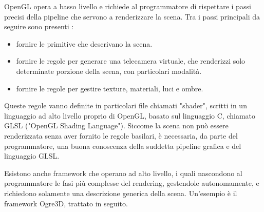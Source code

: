 OpenGL opera a basso livello e richiede al programmatore di rispettare i passi precisi della pipeline che servono a renderizzare la scena. Tra i passi principali da seguire sono presenti :

\begin{itemize}
\item fornire le primitive che descrivano la scena.
\item fornire le regole per generare una telecamera virtuale, che renderizzi solo determinate porzione della scena, con particolari modalità.
\item fornire le regole per gestire texture, materiali, luci e ombre.
\end{itemize}

Queste regole vanno definite in particolari file chiamati "shader", scritti in un linguaggio ad alto livello proprio di OpenGL, basato sul linguaggio C, chiamato GLSL ("OpenGL Shading Language"). Siccome la scena non può essere renderizzata senza aver fornito le regole basilari, è necessaria, da parte del programmatore, una buona conoscenza della suddetta pipeline grafica e del linguaggio GLSL.

Esistono anche framework che operano ad alto livello, i quali nascondono al programmatore le fasi più complesse del rendering, gestendole autonomamente, e richiedono solamente una descrizione generica della scena. Un'esempio è il framework Ogre3D, trattato in seguito.

\clearpage